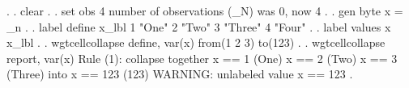 {\smallskip}
. 
. clear
{\smallskip}
. 
. set obs 4
number of observations (_N) was 0, now 4
{\smallskip}
. 
. gen byte x = _n
{\smallskip}
. 
. label define x_lbl 1 "One" 2 "Two" 3 "Three" 4 "Four"
{\smallskip}
. 
. label values x x_lbl
{\smallskip}
. 
. wgtcellcollapse define, var(x) from(1 2 3) to(123)
{\smallskip}
. 
. wgtcellcollapse report, var(x)
{\smallskip}
Rule (1): collapse together
  x == 1 (One)
  x == 2 (Two)
  x == 3 (Three)
  into x == 123 (123)
  WARNING: unlabeled value x == 123
{\smallskip}
{\smallskip}
. 
